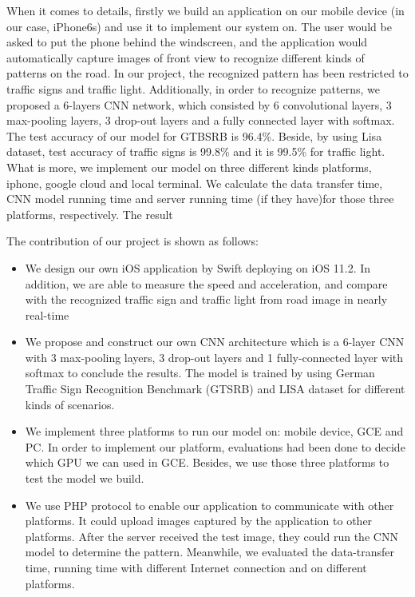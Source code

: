 \documentclass[conference]{IEEEtran}
\begin{document}
When it comes to details, firstly we build an application on our mobile device (in our case, iPhone6s) and use it to implement our system on. The user would be asked to put the phone behind the windscreen, and the application would automatically capture images of front view to recognize different kinds of patterns on the road. In our project, the recognized pattern has been restricted to traffic signs and traffic light. Additionally, in order to recognize patterns, we proposed a 6-layers CNN network, which consisted by 6 convolutional layers, 3 max-pooling layers, 3 drop-out layers and a fully connected layer with softmax. The test accuracy of our model for GTBSRB is 96.4\%.  Beside, by using Lisa dataset, test accuracy of traffic signs is 99.8\% and it is 99.5\% for traffic light. What is more, we implement our model on three different kinds platforms, iphone, google cloud and local terminal. We calculate the data transfer time, CNN model running time and server running time (if they have)for those three platforms, respectively. The result


The contribution of our project is shown as follows: 

\begin{itemize}
  \item We design our own iOS application by Swift deploying on iOS 11.2. In addition, we are able to measure the speed and acceleration, and compare with the recognized traffic sign and traffic light from road image in nearly real-time 
  \item We propose and construct our own CNN architecture which is a 6-layer CNN with 3 max-pooling layers, 3 drop-out layers and 1 fully-connected layer with softmax to conclude the results. The model is trained by using German Traffic Sign Recognition Benchmark (GTSRB) and LISA dataset for different kinds of scenarios.
  \item We implement three platforms to run our model on: mobile device, GCE and PC. In order to implement our platform, evaluations had been done to decide which GPU we can used in GCE. Besides, we use those three platforms to test the model we build.
  \item  We use PHP protocol to enable our application to communicate with other platforms. It could upload images captured by the application to other platforms. After the server received the test image, they could run the CNN model to determine the pattern. Meanwhile, we evaluated the data-transfer time, running time with different Internet connection and on different platforms.
\end{itemize}
\end{document}

